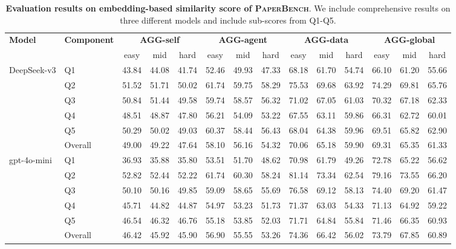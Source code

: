 \begin{table*}[htbp]
\centering
\small
\renewcommand{\arraystretch}{1.3}
\setlength{\tabcolsep}{4pt}
\caption{\textbf{Evaluation results on embedding-based similarity score of \textsc{PaperBench}}. We include comprehensive results on three different models and include sub-scores from Q1-Q5.}
\begin{tabular}{llcccccccccccc}
\toprule
\textbf{Model} & \textbf{Component} & \multicolumn{3}{c}{\textbf{AGG-self}} & \multicolumn{3}{c}{\textbf{AGG-agent}} & \multicolumn{3}{c}{\textbf{AGG-data}} & \multicolumn{3}{c}{\textbf{AGG-global}} \\
\cmidrule(lr){3-5} \cmidrule(lr){6-8} \cmidrule(lr){9-11} \cmidrule(lr){12-14}
& & easy & mid & hard & easy & mid & hard & easy & mid & hard & easy & mid & hard \\
\midrule

\multirow{6}{*}{DeepSeek-v3}
& Q1      & 43.84 & 44.08 & 41.74 & 52.46 & 49.93 & 47.33 & 68.18 & 61.70 & 54.74 & 66.10 & 61.20 & 55.66 \\
& Q2      & 51.52 & 51.71 & 50.02 & 61.74 & 59.75 & 58.29 & 75.53 & 69.68 & 63.92 & 74.29 & 69.81 & 65.76 \\
& Q3      & 50.84 & 51.44 & 49.58 & 59.74 & 58.57 & 56.32 & 71.02 & 67.05 & 61.03 & 70.32 & 67.18 & 62.33 \\
& Q4      & 48.51 & 48.87 & 47.80 & 56.21 & 54.09 & 53.22 & 67.55 & 63.11 & 59.86 & 66.31 & 62.72 & 60.01 \\
& Q5      & 50.29 & 50.02 & 49.03 & 60.37 & 58.44 & 56.43 & 68.04 & 64.38 & 59.96 & 69.51 & 65.82 & 62.90 \\
& Overall & 49.00 & 49.22 & 47.64 & 58.10 & 56.16 & 54.32 & 70.06 & 65.18 & 59.90 & 69.31 & 65.35 & 61.33 \\

\midrule
\multirow{6}{*}{gpt-4o-mini}
& Q1      & 36.93 & 35.88 & 35.80 & 53.51 & 51.70 & 48.62 & 70.98 & 61.79 & 49.26 & 72.78 & 65.22 & 56.62 \\
& Q2      & 52.82 & 52.44 & 52.22 & 61.74 & 60.30 & 58.24 & 81.14 & 73.34 & 62.54 & 79.16 & 73.55 & 66.20 \\
& Q3      & 50.10 & 50.16 & 49.85 & 59.09 & 58.65 & 55.69 & 76.58 & 69.12 & 58.13 & 74.40 & 69.20 & 61.47 \\
& Q4      & 45.71 & 44.82 & 44.87 & 54.97 & 53.23 & 51.73 & 71.37 & 63.03 & 54.33 & 71.13 & 64.92 & 59.22 \\
& Q5      & 46.54 & 46.32 & 46.76 & 55.18 & 53.85 & 52.03 & 71.71 & 64.84 & 55.84 & 71.46 & 66.35 & 60.93 \\
& Overall & 46.42 & 45.92 & 45.90 & 56.90 & 55.55 & 53.26 & 74.36 & 66.42 & 56.02 & 73.79 & 67.85 & 60.89 \\


\end{tabular}
\end{table*}
